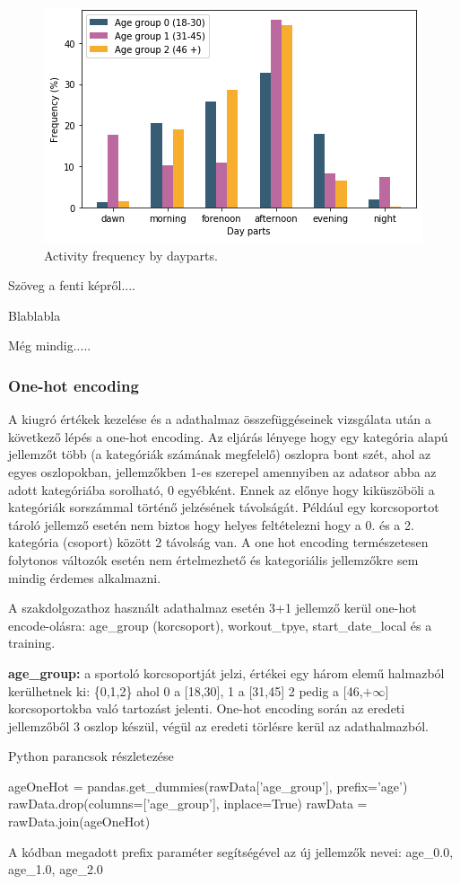 \begin{figure}[h!]
	\includegraphics{kepek/frequencyByAgeAndDayparts.png}
	\caption{Activity frequency by dayparts.}
	\label{fig:frequencyByDayparts}
\end{figure}


Szöveg a fenti képről....

Blablabla

Még mindig.....






\subsubsection{One-hot encoding}
A kiugró értékek kezelése és a adathalmaz összefüggéseinek vizsgálata után a következő lépés a one-hot encoding. Az eljárás lényege hogy egy kategória alapú jellemzőt több (a kategóriák számának megfelelő) oszlopra bont szét, ahol az egyes oszlopokban, jellemzőkben 1-es szerepel amennyiben az adatsor abba az adott kategóriába sorolható, 0 egyébként. Ennek az előnye hogy kiküszöböli a kategóriák sorszámmal történő jelzésének távolságát. Például egy korcsoportot tároló jellemző esetén nem biztos hogy helyes feltételezni hogy a 0. és a 2. kategória (csoport) között 2 távolság van. A one hot encoding természetesen folytonos változók esetén nem értelmezhető és kategoriális jellemzőkre sem mindig érdemes alkalmazni.

A szakdolgozathoz használt adathalmaz esetén 3+1 jellemző kerül one-hot encode-olásra: age\_group (korcsoport), workout\_tpye, start\_date\_local és a training.

\textbf{age\_group:} a sportoló korcsoportját jelzi, értékei egy három elemű halmazból kerülhetnek ki: \{0,1,2\} ahol 0 a [18,30], 1 a [31,45] 2 pedig a [46,$+\infty$] korcsoportokba való tartozást jelenti. One-hot encoding során az eredeti jellemzőből 3 oszlop készül, végül az eredeti törlésre kerül az adathalmazból.
\begin{programreszlet}
Python parancsok részletezése
\begin{python}
ageOneHot = pandas.get_dummies(rawData['age_group'], prefix='age')
rawData.drop(columns=['age_group'], inplace=True)
rawData = rawData.join(ageOneHot)
\end{python}
\end{programreszlet}
A kódban megadott prefix paraméter segítségével az új jellemzők nevei: age\_0.0, age\_1.0, age\_2.0


